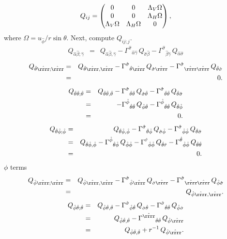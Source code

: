 \documentclass[\mydriver,12pt,twoside,notitlepage,a4paper]{article}
\begin{document}
\begin{equation}
Q_{ij}=
\begin{pmatrix}
0 & 0 & \Lambda_V\Omega \cr
0 & 0 & \Lambda_H\Omega \cr
\Lambda_V\Omega & \Lambda_H\Omega & 0
\end{pmatrix},
\end{equation}
where $\Omega=u_{\hat\phi}/r\sin\theta$.
Next, compute $Q_{ij;j}$.
\begin{eqnarray}
Q_{\hat\alpha\hat\beta;\hat\gamma}
&=&Q_{\hat\alpha\hat\beta,\hat\gamma}
-{\Gamma^{\hat\sigma}}_{\hat\alpha\hat\gamma}\,Q_{\hat\sigma\hat\beta}
-{\Gamma^{\hat\sigma}}_{\hat\beta\hat\gamma}\,Q_{\hat\alpha\hat\sigma}
\end{eqnarray}
\begin{eqnarray}
Q_{\hat\theta\hat\rrrr;\hat\rrrr}
&=&Q_{\hat\theta\hat\rrrr,\hat\rrrr}
-{\Gamma^{\hat\sigma}}_{\hat\theta\hat\rrrr}\,Q_{\hat\sigma\hat\rrrr}
-{\Gamma^{\hat\sigma}}_{\hat\rrrr\hat\rrrr}\,Q_{\hat\theta\hat\sigma}
\cr
&=&0.
\end{eqnarray}
\begin{eqnarray}
Q_{\hat\theta\hat\theta;\hat\theta}
&=&Q_{\hat\theta\hat\theta,\hat\theta}
-{\Gamma^{\hat\sigma}}_{\hat\theta\hat\theta}\,Q_{\hat\sigma\hat\theta}
-{\Gamma^{\hat\sigma}}_{\hat\theta\hat\theta}\,Q_{\hat\theta\hat\sigma}
\cr
&=&
-{\Gamma^{\hat\phi}}_{\hat\theta\hat\theta}\,Q_{\hat\phi\hat\theta}
-{\Gamma^{\hat\phi}}_{\hat\theta\hat\theta}\,Q_{\hat\theta\hat\phi}
\cr
&=&0.
\end{eqnarray}
\begin{eqnarray}
Q_{\hat\theta\hat\phi;\hat\phi}
&=&Q_{\hat\theta\hat\phi,\hat\phi}
-{\Gamma^{\hat\sigma}}_{\hat\theta\hat\phi}\,Q_{\hat\sigma\hat\phi}
-{\Gamma^{\hat\sigma}}_{\hat\phi\hat\phi}\,Q_{\hat\theta\hat\sigma}
\cr
&=&Q_{\hat\theta\hat\phi,\hat\phi}
-{\Gamma^{\hat\phi}}_{\hat\theta\hat\phi}\,Q_{\hat\phi\hat\phi}
-{\Gamma^{\hat r}}_{\hat\phi\hat\phi}\,Q_{\hat\theta\hat r}
-{\Gamma^{\hat\theta}}_{\hat\phi\hat\phi}\,Q_{\hat\theta\hat\theta}
\cr
&=&0.
\end{eqnarray}
$\phi$ terms
\begin{eqnarray}
Q_{\hat\phi\hat\rrrr;\hat\rrrr}
&=&Q_{\hat\phi\hat\rrrr,\hat\rrrr}
-{\Gamma^{\hat\sigma}}_{\hat\phi\hat\rrrr}\,Q_{\hat\sigma\hat\rrrr}
-{\Gamma^{\hat\sigma}}_{\hat\rrrr\hat\rrrr}\,Q_{\hat\phi\hat\sigma}
\cr
&=&Q_{\hat\phi\hat\rrrr,\hat\rrrr}.
\end{eqnarray}
\begin{eqnarray}
Q_{\hat\phi\hat\theta;\hat\theta}
&=&Q_{\hat\phi\hat\theta,\hat\theta}
-{\Gamma^{\hat\sigma}}_{\hat\phi\hat\theta}\,Q_{\hat\sigma\hat\theta}
-{\Gamma^{\hat\sigma}}_{\hat\theta\hat\theta}\,Q_{\hat\phi\hat\sigma}
\cr
&=&Q_{\hat\phi\hat\theta,\hat\theta}
-{\Gamma^{\hat\rrrr}}_{\hat\theta\hat\theta}\,Q_{\hat\phi\hat\rrrr}
\cr
&=&Q_{\hat\phi\hat\theta,\hat\theta}
+r^{-1}\,Q_{\hat\phi\hat\rrrr}.
\end{eqnarray}
\end{document}
